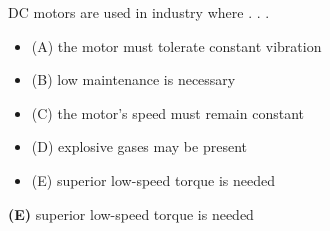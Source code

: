 

DC motors are used in industry where . . .

\begin{itemize}
\item{(A)} the motor must tolerate constant vibration
\vskip 5pt 
\item{(B)} low maintenance is necessary
\vskip 5pt 
\item{(C)} the motor's speed must remain constant
\vskip 5pt 
\item{(D)} explosive gases may be present
\vskip 5pt 
\item{(E)} superior low-speed torque is needed
\end{itemize}







{\bf (E)} superior low-speed torque is needed











